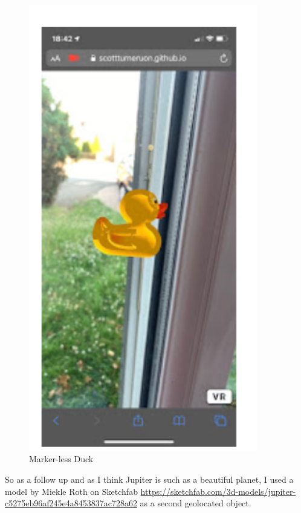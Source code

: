 \begin{figure}
    \centering
    \includegraphics[width=10cm]{chapters/ChapterAR/webar3.png}
    \caption{Marker-less Duck}
    \label{fig:markerless_duck}
\end{figure}

So as a follow up and as I think Jupiter is such as a beautiful planet, I used a model by Miekle Roth on Sketchfab \url{https://sketchfab.com/3d-models/jupiter-c5275eb96af245e4a8453837ac728a62}  as a second geolocated object. 

